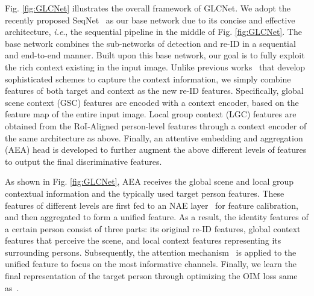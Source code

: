 \documentclass{article}
\def\ie{\emph{i.e}.} \def\Ie{\emph{I.e}.}
\def\ourmodel{GLCNet}
\begin{document}
Fig. \ref{fig:GLCNet} illustrates the overall framework of \ourmodel{}. We adopt the recently proposed SeqNet~\cite{SeqNet} as our base network due to its concise and effective architecture, \ie, the sequential pipeline in the middle of Fig. \ref{fig:GLCNet}. The base network combines the sub-networks of detection and re-ID in a sequential and end-to-end manner. Built upon this base network, our goal is to fully exploit the rich context existing in the input image. Unlike previous works~\cite{Yan2019LearningCG,group_reID_cxt1} that develop sophisticated schemes to capture the context information, we simply combine features of both target and context as the new re-ID features. Specifically, global scene context (GSC) features are encoded with a context encoder, based on the feature map of the entire input image. Local group context (LGC) features are obtained from the RoI-Aligned person-level features through a context encoder of the same architecture as above. Finally, an attentive embedding and aggregation (AEA) head is developed to further augment the above different levels of features to output the final discriminative features.



As shown in Fig. \ref{fig:GLCNet}, AEA receives the global scene and local group contextual information and the typically used target person features. These features of different levels are first fed to an NAE layer~\cite{NAE} for feature calibration, and then aggregated to form a unified feature. As a result, the identity features of a certain person consist of three parts: its original re-ID features, global context features that perceive the scene, and local context features representing its surrounding persons. Subsequently, the attention mechanism~\cite{SEAttention} is applied to the unified feature to focus on the most informative channels. Finally, we learn the final representation of the target person through optimizing the OIM loss same as~\cite{OIM,NAE,SeqNet}.
\end{document}
